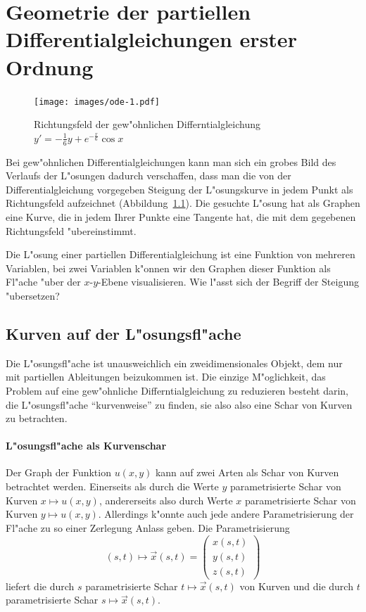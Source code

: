 %
%
%
\chapter{Geometrie der partiellen Differentialgleichungen erster Ordnung\label{chapter-geometrie}}
\begin{figure}
\begin{center}
\texttt{[image: images/ode-1.pdf]}
\end{center}
\caption{Richtungsfeld der gew"ohnlichen Differntialgleichung
$y'=-\frac16y+e^{-\frac{x}6}\cos x$ \label{geometrie:ode}}
\end{figure}
Bei gew"ohnlichen Differentialgleichungen kann man sich ein grobes
Bild des Verlaufs der L"osungen dadurch verschaffen, dass man
die von der Differentialgleichung vorgegeben Steigung der L"osungskurve
in jedem Punkt als Richtungsfeld aufzeichnet (Abbildung~\ref{geometrie:ode}).
Die gesuchte L"osung hat als Graphen eine Kurve, die in jedem Ihrer Punkte eine
Tangente hat, die mit dem gegebenen Richtungsfeld "ubereinstimmt.

Die L"osung einer
partiellen Differentialgleichung ist eine Funktion von mehreren Variablen,
bei zwei Variablen k"onnen wir den Graphen dieser Funktion als Fl"ache
"uber der $x$-$y$-Ebene visualisieren. Wie l"asst sich der Begriff der
Steigung "ubersetzen?


\section{Kurven auf der L"osungsfl"ache}
Die L"osungsfl"ache ist unausweichlich ein zweidimensionales
Objekt, dem nur mit partiellen Ableitungen beizukommen ist.
Die einzige M"oglichkeit, das Problem auf eine gew"ohnliche
Differntialgleichung zu reduzieren besteht darin, die L"osungsfl"ache
``kurvenweise'' zu finden, sie also also eine Schar von Kurven
zu betrachten.

\subsubsection{L"osungsfl"ache als Kurvenschar}
Der Graph der Funktion $u(x,y)$ kann auf zwei Arten als Schar von
Kurven betrachtet werden. Einerseits als durch die Werte $y$
parametrisierte Schar von Kurven $x\mapsto u(x,y)$, andererseits
also durch Werte $x$ parametrisierte Schar von Kurven $y\mapsto u(x,y)$.
Allerdings k"onnte auch jede andere Parametrisierung der Fl"ache
zu so einer Zerlegung Anlass geben. Die Parametrisierung
\begin{equation}
(s,t)\mapsto \vec x(s,t)
=
\begin{pmatrix}x(s,t)\\y(s,t)\\z(s,t)\end{pmatrix}
\label{quasilinear:kurvenschar}
\end{equation}
liefert die durch $s$ parametrisierte Schar $t\mapsto \vec x(s,t)$
von Kurven und die durch $t$ parametrisierte Schar $s\mapsto\vec x(s,t)$.

